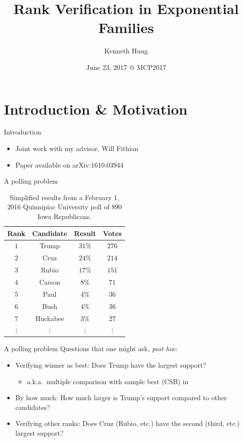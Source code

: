 \documentclass{beamer}
\title[Verifying Winner]{Rank Verification in Exponential Families}
\author[Kenneth Hung]{Kenneth Hung}
\institute[UC Berkeley]{
University of California, Berkeley \\
\medskip
\textit{kenhung@berkeley.edu}
}
\date{June 23, 2017 @ MCP2017}
\begin{document}
\begin{frame}
\titlepage
\end{frame}

\section{Introduction \& Motivation}

\begin{frame}{Introduction}
\begin{itemize}
\item Joint work with my advisor, Will Fithian
\item Paper available on arXiv:1610.03944
\end{itemize}
\end{frame}

\begin{frame}{A polling problem}
\begin{table}[htbp]
\centering
\begin{tabular}{c c c c}
	\hline
	Rank & Candidate & Result & Votes \\
	\hline
	$1$ & Trump & $31\%$ & $276$ \\
	$2$ & Cruz & $24\%$ & $214$ \\
	$3$ & Rubio & $17\%$ & $151$ \\
	$4$ & Carson & $8\%$ & $71$ \\
	$5$ & Paul & $4\%$ & $36$ \\
	$6$ & Bush & $4\%$ & $36$ \\
	$7$ & Huckabee & $3\%$ & $27$ \\
	$\vdots$ & $\vdots$ & $\vdots $ & $\vdots$ \\
	\hline
\end{tabular}
\caption{Simplified results from a February 1, 2016 Quinnipiac University poll of $890$ Iowa Republicans.}
\label{tbl:poll}
\end{table}
\end{frame}

\begin{frame}{A polling problem}
Questions that one might ask, {\it post hoc}:
\begin{itemize}
\item Verifying winner as best: Does Trump have the largest support?
\begin{itemize}
\item a.k.a.\ multiple comparison with sample best (CSB) in \citet{Stefansson:1988wj}
\end{itemize}
\item By how much: How much larger is Trump's support compared to other candidates?
\item Verifying other ranks: Does Cruz (Rubio, etc.) have the second (third, etc.) largest support? 
\end{itemize}
\end{frame}
\end{document}
